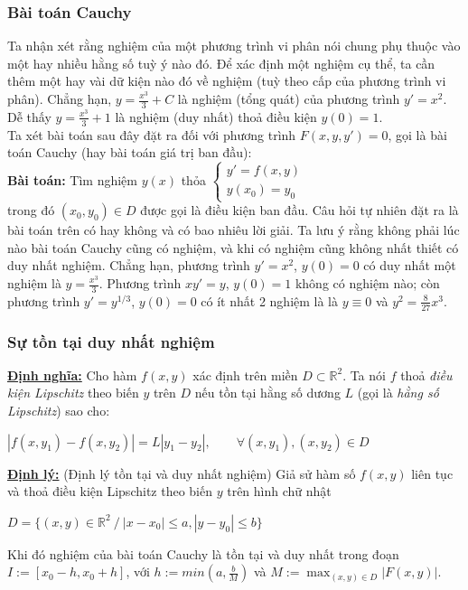 \documentclass[13pt,a4paper]{article}
\begin{document}
			\subsubsection{Bài toán Cauchy}
				Ta nhận xét rằng nghiệm của một phương trình vi phân nói chung phụ thuộc vào một hay nhiều hằng số tuỳ ý nào đó. Để xác định một nghiệm cụ thể, ta cần thêm một hay vài dữ kiện nào đó về nghiệm (tuỳ theo cấp của phương trình vi phân). Chẳng hạn, $y = \frac{x^3}{3} + C$ là nghiệm (tổng quát) của phương trình $y' = x^2$. Dễ thấy $y = \frac{x^3}{3} + 1$ là nghiệm (duy nhất) thoả điều kiện $y(0) = 1$. \\
				Ta xét bài toán sau đây đặt ra đối với phương trình $F(x, y, y') = 0$, gọi là bài toán Cauchy (hay bài toán giá trị ban đầu):\\
				\textbf{Bài toán:} Tìm nghiệm $y(x)$ thỏa
				$\left\{\begin{array}{l}
						y' = f(x,y) \\
						y(x_0) = y_0
					\end{array}\right.$ \\
				trong đó $(x_0, y_0) \in D$ được gọi là điều kiện ban đầu.
				Câu hỏi tự nhiên đặt ra là bài toán trên có hay không và có bao nhiêu lời giải. Ta lưu ý rằng không phải lúc nào bài toán Cauchy cũng có nghiệm, và khi có nghiệm cũng không nhất thiết có duy nhất nghiệm. Chẳng hạn, phương trình $y' = x^2$, $y(0) = 0$ có duy nhất một nghiệm là $y = \frac{x^3}{3}$. Phương trình $xy' = y$, $y(0) = 1$ không có nghiệm nào; còn phương trình $y' = y^{1/3}$, $y(0) = 0$ có ít nhất 2 nghiệm là là $y \equiv 0$ và $y^2 = \frac{8}{27}x^3$.
			\subsubsection{Sự tồn tại duy nhất nghiệm}
				\textbf{\underline{Định nghĩa:}} Cho hàm $f(x, y)$ xác định trên miền $D \subset \mathbb{R}^2$. Ta nói $f$ thoả \textit{điều kiện Lipschitz} theo biến $y$ trên $D$ nếu tồn tại hằng số dương $L$ (gọi là \textit{hằng số Lipschitz}) sao cho:
				\begin{center}
					\color{blue}
						$|f(x,y_1) - f(x,y_2)| = L|y_1 - y_2|,\qquad \forall (x, y_1), (x, y_2) \in D $
					\color{blue}
				\end{center}
				\textbf{\underline{Định lý:}} (Định lý tồn tại và duy nhất nghiệm) Giả sử hàm số $f(x, y)$ liên tục và thoả điều kiện Lipschitz theo biến $y$ trên hình chữ nhật
				\begin{center}
					\color{blue}
						$D = \{(x,y) \in \mathbb{R}^2 \ /\ |x - x_0| \leq a, |y - y_0| \leq b\}$
					\color{blue}
				\end{center}
				Khi đó nghiệm của bài toán Cauchy là tồn tại và duy nhất trong đoạn $I := [x_0 - h, x_0 + h]$, với $h := min(a, \frac{b}{M})$ và $M := \displaystyle \max_{(x,y) \in D}|F(x,y)|$.
\end{document}
